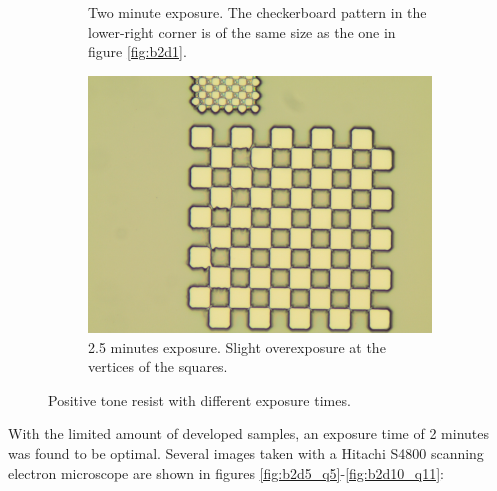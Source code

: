 \begin{figure}[ht]
\begin{subfigure}[t]{0.3\linewidth}
        \caption{Two minute exposure. The checkerboard pattern in the lower-right corner is of the same size as the one in figure \ref{fig:b2d1}.}
        \label{fig:b3a1}
    \end{subfigure}
    \hfill
    \begin{subfigure}[t]{0.3\linewidth}
        \centering
        \includegraphics[width=\textwidth]{data/b3e1.jpg}
        \caption{2.5 minutes exposure. Slight overexposure at the vertices of the squares.}
        \label{fig:b3e1}
    \end{subfigure}
    \hfill
    \caption{Positive tone resist with different exposure times.}
\end{figure}

With the limited amount of developed samples, an exposure time of 2 minutes was found to be optimal. Several images taken with a Hitachi S4800 scanning electron microscope are shown in figures \ref{fig:b2d5_q5}-\ref{fig:b2d10_q11}:

